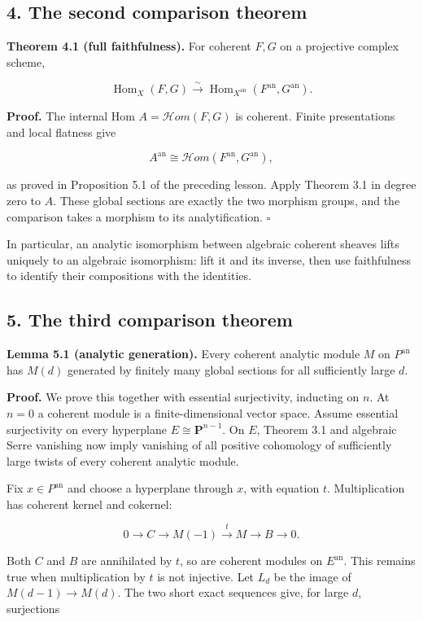 \documentclass[11pt]{article}
\begin{document}
\subsection{4. The second comparison
theorem}\label{the-second-comparison-theorem}

\textbf{Theorem 4.1 (full faithfulness).} For coherent \(F,G\) on a
projective complex scheme,

\[
\operatorname{Hom}_X(F,G)
\xrightarrow{\sim}
\operatorname{Hom}_{X^{\mathrm{an}}}(F^{\mathrm{an}},G^{\mathrm{an}}).
\]

\textbf{Proof.} The internal Hom \(A=\mathcal Hom(F,G)\) is coherent.
Finite presentations and local flatness give

\[
A^{\mathrm{an}}\cong\mathcal Hom(F^{\mathrm{an}},G^{\mathrm{an}}),
\]

as proved in Proposition 5.1 of the preceding lesson. Apply Theorem 3.1
in degree zero to \(A\). These global sections are exactly the two
morphism groups, and the comparison takes a morphism to its
analytification. \(\square\)

In particular, an analytic isomorphism between algebraic coherent
sheaves lifts uniquely to an algebraic isomorphism: lift it and its
inverse, then use faithfulness to identify their compositions with the
identities.

\subsection{5. The third comparison
theorem}\label{the-third-comparison-theorem}

\textbf{Lemma 5.1 (analytic generation).} Every coherent analytic module
\(M\) on \(P^{\mathrm{an}}\) has \(M(d)\) generated by finitely many
global sections for all sufficiently large \(d\).

\textbf{Proof.} We prove this together with essential surjectivity,
inducting on \(n\). At \(n=0\) a coherent module is a finite-dimensional
vector space. Assume essential surjectivity on every hyperplane
\(E\cong\mathbf P^{n-1}\). On \(E\), Theorem 3.1 and algebraic Serre
vanishing now imply vanishing of all positive cohomology of sufficiently
large twists of every coherent analytic module.

Fix \(x\in P^{\mathrm{an}}\) and choose a hyperplane through \(x\), with
equation \(t\). Multiplication has coherent kernel and cokernel:

\[
0\to C\to M(-1)\xrightarrow{t}M\to B\to0.
\]

Both \(C\) and \(B\) are annihilated by \(t\), so are coherent modules
on \(E^{\mathrm{an}}\). This remains true when multiplication by \(t\)
is not injective. Let \(L_d\) be the image of \(M(d-1)\to M(d)\). The
two short exact sequences give, for large \(d\), surjections
\end{document}
